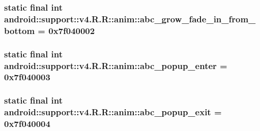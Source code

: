 \hypertarget{classandroid_1_1support_1_1v4_1_1_r_1_1anim_f7b89aeeb7fe3fa3e042123a298d2a5b}{
\subsubsection[{abc\_\-grow\_\-fade\_\-in\_\-from\_\-bottom}]{\setlength{\rightskip}{0pt plus 5cm}static final int android::support::v4.R.R::anim::abc\_\-grow\_\-fade\_\-in\_\-from\_\-bottom = 0x7f040002}}
\label{classandroid_1_1support_1_1v4_1_1_r_1_1anim_f7b89aeeb7fe3fa3e042123a298d2a5b}


\hypertarget{classandroid_1_1support_1_1v4_1_1_r_1_1anim_a48473f7681d9a103407be05207b2809}{
\subsubsection[{abc\_\-popup\_\-enter}]{\setlength{\rightskip}{0pt plus 5cm}static final int android::support::v4.R.R::anim::abc\_\-popup\_\-enter = 0x7f040003}}
\label{classandroid_1_1support_1_1v4_1_1_r_1_1anim_a48473f7681d9a103407be05207b2809}


\hypertarget{classandroid_1_1support_1_1v4_1_1_r_1_1anim_822317f72f8e2f6a6f9248ff5848ea8d}{
\subsubsection[{abc\_\-popup\_\-exit}]{\setlength{\rightskip}{0pt plus 5cm}static final int android::support::v4.R.R::anim::abc\_\-popup\_\-exit = 0x7f040004}}
\label{classandroid_1_1support_1_1v4_1_1_r_1_1anim_822317f72f8e2f6a6f9248ff5848ea8d}


